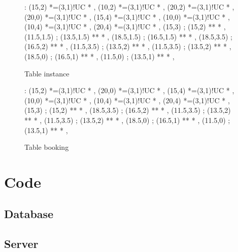 \documentclass[a4paper,10pt]{article}
\newcommand{\primarykey}[1]{\mbox{{\color{NavyBlue}{$#1$}}}}
\newcommand{\foreignkey}[1]{{\mbox{\color{Emerald}{$#1$}}}}
\begin{document}
\vspace{15mm}
\begin{figure}[hp]

\xy<1cm,0cm>:
(15,2) *=(3,1)!UC\txt{\primarykey{UniqueID}} *\frm{-} ,
(10,2) *=(3,1)!UC *\frm{-} ,
(20,2) *=(3,1)!UC *\frm{-} ,
(20,0) *=(3,1)!UC *\frm{-} ,
(15,4) *=(3,1)!UC\txt{\foreignkey{ServiceID}} *\frm{-} ,
(10,0) *=(3,1)!UC *\frm{-} ,
(10,4) *=(3,1)!UC *\frm{-} ,
(20,4) *=(3,1)!UC *\frm{-} ,
(15,3) ; (15,2) **\dir{-}  *\dir{>} ,
(11.5,1.5) ; (13.5,1.5) **\dir{-}  *\dir{>} ,
(18.5,1.5) ; (16.5,1.5) **\dir{-}  *\dir{>} ,
(18.5,3.5) ; (16.5,2) **\dir{-}  *\dir{>} ,
(11.5,3.5) ; (13.5,2) **\dir{-}  *\dir{>} ,
(11.5,3.5) ; (13.5,2) **\dir{-}  *\dir{>} ,
(18.5,0) ; (16.5,1) **\dir{-}  *\dir{>} ,
(11.5,0) ; (13.5,1) **\dir{-}  *\dir{>} ,
\endxy

\caption{Table instance}

\end{figure}

\vspace{15mm}
\begin{figure}[hp]

\xy<1cm,0cm>:
(15,2) *=(3,1)!UC\txt{\primarykey{BookingID}} *\frm{-} ,
(20,0) *=(3,1)!UC *\frm{-} ,
(15,4) *=(3,1)!UC\txt{\foreignkey{UniqueID}} *\frm{-} ,
(10,0) *=(3,1)!UC *\frm{-} ,
(10,4) *=(3,1)!UC *\frm{-} ,
(20,4) *=(3,1)!UC *\frm{-} ,
(15,3) ; (15,2) **\dir{-}  *\dir{>} ,
(18.5,3.5) ; (16.5,2) **\dir{-}  *\dir{>} ,
(11.5,3.5) ; (13.5,2) **\dir{-}  *\dir{>} ,
(11.5,3.5) ; (13.5,2) **\dir{-}  *\dir{>} ,
(18.5,0) ; (16.5,1) **\dir{-}  *\dir{>} ,
(11.5,0) ; (13.5,1) **\dir{-}  *\dir{>} ,
\endxy

\caption{Table booking}

\end{figure}

\pagebreak
\section{Code}

\subsection{Database}

\lstset{breaklines=true,tabsize=3,basicstyle=\ttfamily}


\subsection{Server}
\end{document}
